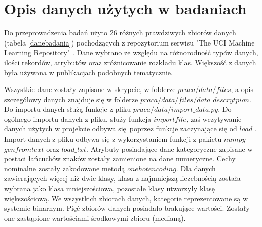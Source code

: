 \section{Opis danych użytych w badaniach}
Do przeprowadzenia badań użyto 26 różnych prawdziwych zbiorów danych (tabela \ref{danebadania}) pochodzących z repozytorium serwisu "The UCI Machine Learning Repository" \cite{uci}. Dane wybrano ze względu na różnorodność typów danych, ilości rekordów, atrybutów oraz zróżnicowanie rozkładu klas. Większość z danych była używana w publikacjach podobnych tematycznie\cite{hyper}\cite{StefImbalanced}. \par
Wszystkie dane zostały zapisane w skrypcie, w folderze $praca/data/files$, a opis szczegółowy danych znajduje się w folderze $praca/data/files/data\_descrytpion$. Do importu danych służą funkcje z pliku $praca/data/import\_data.py$. Do ogólnego importu danych z pliku, służy funkcja $importfile$, zaś wczytywanie danych użytych w projekcie odbywa się poprzez funkcje zaczynające się od $load\_$. Import danych z pliku odbywa się z wykorzystaniem funkcji z pakietu $numpy$ $genfromtext$ oraz $load\_txt$. Atrybuty posiadające dane kategoryczne zapisane w postaci łańcuchów znaków zostały zamienione na dane numeryczne. Cechy nominalne zostały zakodowane metodą $one hot encoding$. Dla danych zawierających więcej niż dwie klasy, klasa z najmniejszą liczebnością została wybrana jako klasa mniejszościowa, pozostałe klasy utworzyły klasę większościową. We wszystkich zbiorach danych, kategorie reprezentowane są w systemie binarnym. Pięć zbiorów danych posiadało brakujące wartości. Zostały one zastąpione wartościami środkowymi zbioru (medianą).
